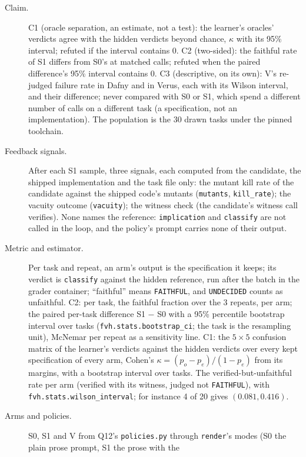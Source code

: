 \documentclass[11pt]{article}
\begin{document}
\begin{description}
\item[Claim.] C1 (oracle separation, an estimate, not a test): the learner's
  oracles' verdicts agree with the hidden verdicts beyond chance, $\kappa$
  with its 95\% interval; refuted if the interval contains 0. C2 (two-sided):
  the faithful rate of S1 differs from S0's at matched calls; refuted when the
  paired difference's 95\% interval contains 0. C3 (descriptive, on its own):
  V's re-judged failure rate in Dafny and in Verus, each with its Wilson
  interval, and their difference; never compared with S0 or S1, which spend a
  different number of calls on a different task (a specification, not an
  implementation). The population is the 30 drawn tasks under the pinned
  toolchain.
\item[Feedback signals.] After each S1 sample, three signals, each computed
  from the candidate, the shipped implementation and the task file only: the
  mutant kill rate of the candidate against the shipped code's mutants
  (\texttt{mutants}, \texttt{kill\_rate}); the vacuity outcome
  (\texttt{vacuity}); the witness check (the candidate's witness call
  verifies). None names the reference: \texttt{implication} and
  \texttt{classify} are not called in the loop, and the policy's prompt
  carries none of their output.
\item[Metric and estimator.] Per task and repeat, an arm's output is the
  specification it keeps; its verdict is \texttt{classify} against the hidden
  reference, run after the batch in the grader container; ``faithful'' means
  \texttt{FAITHFUL}, and \texttt{UNDECIDED} counts as unfaithful. C2: per task,
  the faithful fraction over the 3 repeats, per arm; the paired per-task
  difference S1 $-$ S0 with a 95\% percentile bootstrap interval over tasks
  (\texttt{fvh.stats.bootstrap\_ci}; the task is the resampling unit), McNemar
  per repeat as a sensitivity line. C1: the $5 \times 5$ confusion matrix of
  the learner's verdicts against the hidden verdicts over every kept
  specification of every arm, Cohen's $\kappa = (p_o - p_e)/(1 - p_e)$ from
  its margins, with a bootstrap interval over tasks. The verified-but-unfaithful
  rate per arm (verified with its witness, judged not \texttt{FAITHFUL}), with
  \texttt{fvh.stats.wilson\_interval}; for instance 4 of 20 gives
  $(0.081, 0.416)$.
\item[Arms and policies.] S0, S1 and V from Q12's \texttt{policies.py} through
  \texttt{render}'s modes (S0 the plain prose prompt, S1 the prose with the

\end{description}
\end{document}
